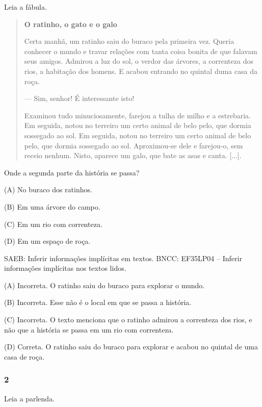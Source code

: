 Leia a fábula.

\begin{quote}
\textbf{O ratinho, o gato e o galo}

Certa manhã, um ratinho saiu do buraco pela primeira vez. Queria
conhecer o mundo e travar relações com tanta coisa bonita de que falavam
seus amigos. Admirou a luz do sol, o verdor das árvores, a correnteza
dos rios, a habitação dos homens. E acabou entrando no quintal duma casa
da roça.

--- Sim, senhor! É interessante isto!

Examinou tudo minuciosamente, farejou a tulha de milho e a estrebaria.
Em seguida, notou no terreiro um certo animal de belo pelo, que dormia
sossegado ao sol. Em seguida, notou no terreiro um certo animal de belo
pelo, que dormia sossegado ao sol. Aproximou-se dele e farejou-o, sem
receio nenhum. Nisto, aparece um galo, que bate as asas e canta.
{[}...{]}.

\end{quote}

Onde a segunda parte da história se passa?

(A) No buraco dos ratinhos.

(B) Em uma árvore do campo.

(C) Em um rio com correnteza.

(D) Em um espaço de roça.

\protect\hypertarget{_Hlk127278651}{}{}SAEB: Inferir informações implícitas em textos.
BNCC: EF35LP04 -- Inferir informações implícitas nos textos lidos.

(A) Incorreta. O ratinho saiu do buraco para explorar o mundo.

(B) Incorreta. Esse não é o local em que se passa a história.

(C) Incorreta. O texto menciona que o ratinho admirou a correnteza dos
rios, e não que a história se passa em um rio com correnteza.

(D) Correta. O ratinho saiu do buraco para explorar e acabou no quintal
de uma casa de roça.

\subsubsection{2 }\label{section-14}

Leia a parlenda.

